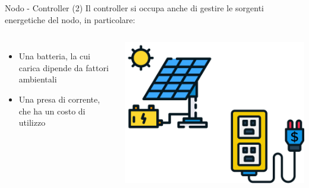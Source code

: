 \documentclass[compress]{beamer}
\begin{document}
\begin{frame}{Nodo - Controller (2)}
    Il controller si occupa anche di gestire le sorgenti energetiche del nodo, in particolare:
    \vspace{0.5cm}
        \begin{columns}
                \begin{minipage}[b]{1\textwidth}
                    \begin{itemize}
                        \item Una batteria, la cui carica dipende da fattori ambientali
                        \item Una presa di corrente, che ha un costo di utilizzo
                    \end{itemize}
                \end{minipage}
                \begin{minipage}{.9\textwidth}
                    \begin{adjustbox}{margin=0.5cm 0cm 0.1cm 0.2cm, center} %
                        \includegraphics[width=1\textwidth]{figs/socket_battery.png}
                    \end{adjustbox}
                \end{minipage}
        \end{columns}
    \end{frame}
\end{document}

